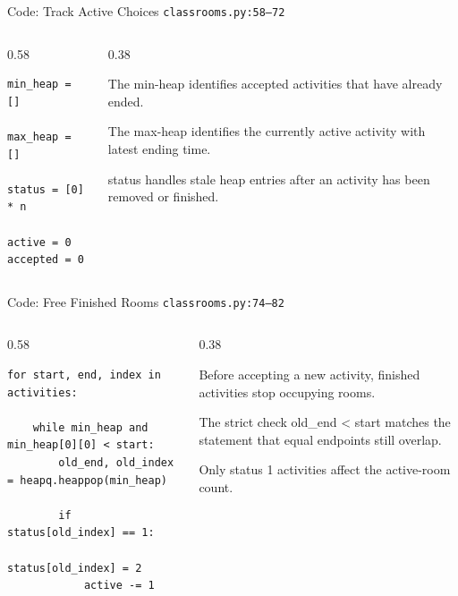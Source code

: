 \documentclass[aspectratio=169,11pt]{beamer}
\begin{document}
\begin{frame}[fragile]{Code: Track Active Choices}
\scriptsize
{} \texttt{classrooms.py:58--72}

\vspace{0.08cm}
\begin{columns}[T,totalwidth=\textwidth]
\begin{column}{0.58\textwidth}
\begin{lstlisting}[style=cpcode]
min_heap = []

max_heap = []

status = [0] * n

active = 0
accepted = 0
\end{lstlisting}
\end{column}
\begin{column}{0.38\textwidth}
\begin{tightitemize}
  \item The min-heap identifies accepted activities that have already ended.
  \item The max-heap identifies the currently active activity with latest ending time.
  \item status handles stale heap entries after an activity has been removed or finished.
\end{tightitemize}
\end{column}
\end{columns}
\end{frame}

\begin{frame}[fragile]{Code: Free Finished Rooms}
\scriptsize
{} \texttt{classrooms.py:74--82}

\vspace{0.08cm}
\begin{columns}[T,totalwidth=\textwidth]
\begin{column}{0.58\textwidth}
\begin{lstlisting}[style=cpcode]
for start, end, index in activities:

    while min_heap and min_heap[0][0] < start:
        old_end, old_index = heapq.heappop(min_heap)

        if status[old_index] == 1:
            status[old_index] = 2
            active -= 1
\end{lstlisting}
\end{column}
\begin{column}{0.38\textwidth}
\begin{tightitemize}
  \item Before accepting a new activity, finished activities stop occupying rooms.
  \item The strict check old\_end < start matches the statement that equal endpoints still overlap.
  \item Only status 1 activities affect the active-room count.
\end{tightitemize}
\end{column}
\end{columns}
\end{frame}
\end{document}
